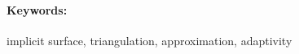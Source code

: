 \documentclass[12pt, twoside]{book}
\begin{document}
\paragraph*{Keywords:} implicit surface, triangulation, approximation, adaptivity


%
%



\newpage 

\tableofcontents



\newpage 

\listoffigures
\listoftables


\mainmatter


 









%







\newpage	

\backmatter

\thispagestyle{empty}
\clearpage


 

 
\end{document}

